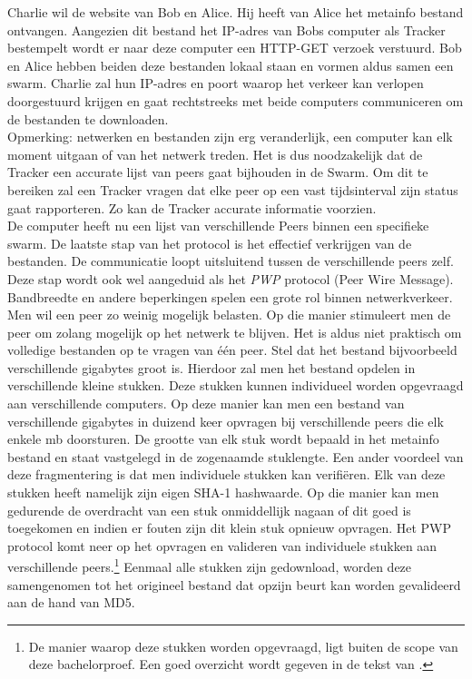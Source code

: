 Charlie wil de website van Bob en Alice. Hij heeft van Alice het metainfo bestand ontvangen. Aangezien dit bestand het IP-adres van Bobs computer als Tracker bestempelt wordt er naar deze computer een HTTP-GET verzoek verstuurd. Bob en Alice hebben beiden deze bestanden lokaal staan en vormen aldus samen een swarm. Charlie zal hun IP-adres en poort waarop het verkeer kan verlopen doorgestuurd krijgen en gaat rechtstreeks met beide computers communiceren om de bestanden te downloaden.\\

Opmerking: netwerken en bestanden zijn erg veranderlijk, een computer kan elk moment uitgaan of van het netwerk treden. Het is dus noodzakelijk dat de Tracker een accurate lijst van peers gaat bijhouden in de Swarm. Om dit te bereiken zal een Tracker vragen dat elke peer op een vast tijdsinterval zijn status gaat rapporteren. Zo kan de Tracker accurate informatie voorzien.\\

De computer heeft nu een lijst van verschillende Peers binnen een specifieke swarm. De laatste stap van het protocol is het effectief verkrijgen van de bestanden. De communicatie loopt uitsluitend tussen de verschillende peers zelf. Deze stap wordt ook wel aangeduid als het \textit{PWP} protocol (Peer Wire Message). Bandbreedte en andere beperkingen spelen een grote rol binnen netwerkverkeer. Men wil een peer zo weinig mogelijk belasten. Op die manier stimuleert men de peer om zolang mogelijk op het netwerk te blijven. Het is aldus niet praktisch om volledige bestanden op te vragen van één peer. Stel dat het bestand bijvoorbeeld verschillende gigabytes groot is. Hierdoor zal men het bestand opdelen in verschillende kleine stukken. Deze stukken kunnen individueel worden opgevraagd aan verschillende computers. Op deze manier kan men een bestand van verschillende gigabytes in duizend keer opvragen bij verschillende peers die elk enkele mb doorsturen. De grootte van elk stuk wordt bepaald in het metainfo bestand en staat vastgelegd in de zogenaamde stuklengte. Een ander voordeel van deze fragmentering is dat men individuele stukken kan verifiëren. Elk van deze stukken heeft namelijk zijn eigen SHA-1 hashwaarde. Op die manier kan men gedurende de overdracht van een stuk onmiddellijk nagaan of dit goed is toegekomen en indien er fouten zijn dit klein stuk opnieuw opvragen. Het PWP protocol komt neer op het opvragen en valideren van individuele stukken aan verschillende peers.\footnote{De manier waarop deze stukken worden opgevraagd, ligt buiten de scope van deze bachelorproef. Een goed overzicht wordt gegeven in de tekst van \textcite{Fonseca2005}.} Eenmaal alle stukken zijn gedownload, worden deze samengenomen tot het origineel bestand dat opzijn beurt kan worden gevalideerd aan de hand van MD5.\\

